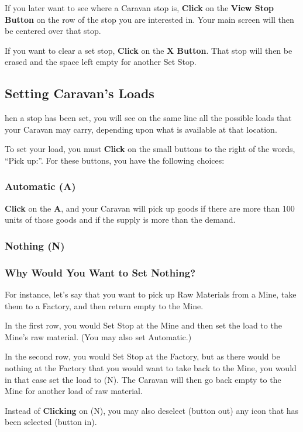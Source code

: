 
If you later want to see where a Caravan stop is, \textbf{Click} on the \textbf{View Stop Button} on the row of the stop you are interested in. Your main screen will then be centered over that stop.

If you want to clear a set stop, \textbf{Click} on the \textbf{X Button}. That stop will then be erased and the space left empty for another Set Stop.

\subsection{\textsf{Setting Caravan’s Loads}}


hen a stop has been set, you will see on the same line all the possible loads that your Caravan may carry, depending upon what is available at that location.

To set your load, you must \textbf{Click} on the small buttons to the right of the words, “Pick up:”. For these buttons, you have the following choices:

\subsubsection{\textsf{Automatic (A)}}

\textbf{Click} on the \textbf{A}, and your Caravan will pick up goods if there are more than 100 units of those goods and if the supply is more than the demand.

\subsubsection{\textsf{Nothing (N)}}

\subsubsection{\textsf{Why Would You Want to Set Nothing?}}

For instance, let’s say that you want to pick up Raw Materials from a Mine, take them to a Factory, and then return empty to the Mine.

\begin{changemargin}{.5cm}{0cm}
In the first row, you would Set Stop at the Mine and then set the load to the Mine’s raw material. (You may also set Automatic.)

In the second row, you would Set Stop at the Factory, but as there would be nothing at the Factory that you would want to take back to the Mine, you would in that case set the load to (N). The Caravan will then go back empty to the Mine for another load of raw material.

Instead of \textbf{Clicking} on (N), you may also deselect (button out) any icon that has been selected (button in).
\end{changemargin}

